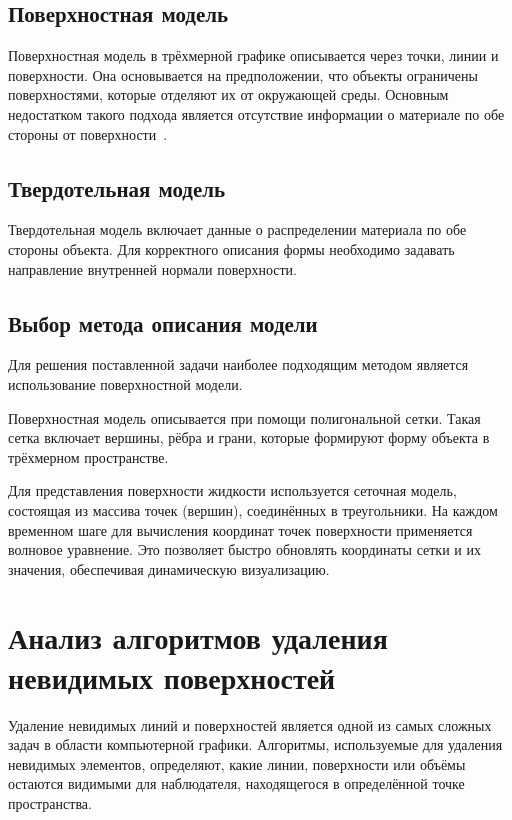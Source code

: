 \subsection{Поверхностная модель}
Поверхностная модель в трёхмерной графике описывается через точки, линии и поверхности.
Она основывается на предположении, что объекты ограничены поверхностями, которые отделяют их от окружающей среды.
Основным недостатком такого подхода является отсутствие информации о материале по обе стороны от поверхности~\cite{MTM}.

\subsection{Твердотельная модель}
Твердотельная модель включает данные о распределении материала по обе стороны объекта.
Для корректного описания формы необходимо задавать направление внутренней нормали поверхности.

\subsection{Выбор метода описания модели}

Для решения поставленной задачи наиболее подходящим методом является использование поверхностной модели.

Поверхностная модель описывается при помощи полигональной сетки.
Такая сетка включает вершины, рёбра и грани, которые формируют форму объекта в трёхмерном пространстве.

Для представления поверхности жидкости используется сеточная модель, состоящая из массива точек (вершин), соединённых в треугольники.
На каждом временном шаге для вычисления координат точек поверхности применяется волновое уравнение.
Это позволяет быстро обновлять координаты сетки и их значения, обеспечивая динамическую визуализацию.

\newpage 

\section{Анализ алгоритмов удаления невидимых поверхностей}

Удаление невидимых линий и поверхностей является одной из самых сложных задач в области компьютерной графики.  
Алгоритмы, используемые для удаления невидимых элементов, определяют, какие линии, поверхности или объёмы остаются видимыми для наблюдателя, находящегося в определённой точке пространства.  


